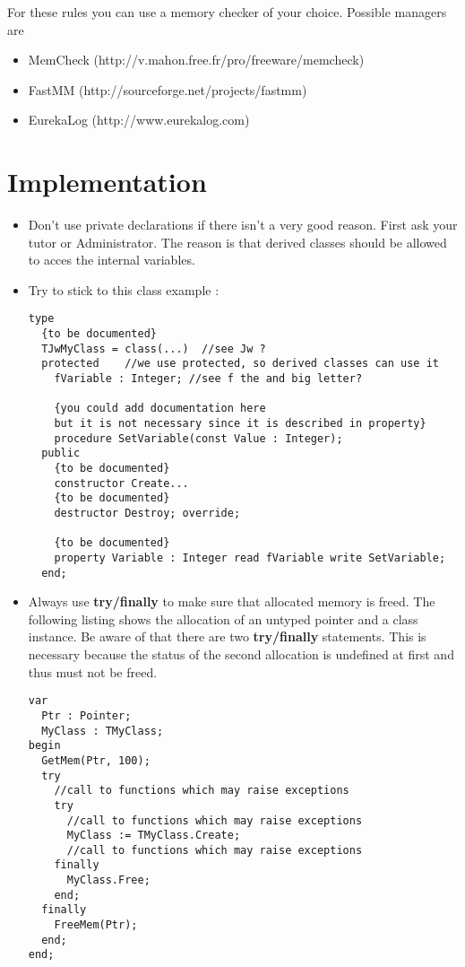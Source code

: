 \documentclass[a4paper,oneside,10pt]{article}
\begin{document}
For these rules you can use a memory checker of your choice. Possible managers are
\begin{itemize}
  \item MemCheck (http://v.mahon.free.fr/pro/freeware/memcheck)
  \item FastMM (http://sourceforge.net/projects/fastmm)
  \item EurekaLog (http://www.eurekalog.com)
\end{itemize}

\section{Implementation}

\begin{itemize}
	\item Don't use private declarations if there isn't a very good reason. First ask your tutor or Administrator. The reason is that derived classes should be allowed to acces the internal variables.
	\item Try to stick to this class example :
\begin{lstlisting}	
type
  {to be documented}
  TJwMyClass = class(...)  //see Jw ?
  protected    //we use protected, so derived classes can use it
    fVariable : Integer; //see f the and big letter?

    {you could add documentation here
    but it is not necessary since it is described in property}
    procedure SetVariable(const Value : Integer);
  public
    {to be documented}
    constructor Create...
    {to be documented}
    destructor Destroy; override;

    {to be documented}
    property Variable : Integer read fVariable write SetVariable;
  end;	
\end{lstlisting}
 
\item Always use \textbf{try/finally} to make sure that allocated memory is freed. The following listing shows the allocation of an untyped pointer and a class instance. Be aware of that there are two \textbf{try/finally} statements. This is necessary because the status of the second allocation is undefined at first and thus must not be freed.

\begin{lstlisting}
var 
  Ptr : Pointer;
  MyClass : TMyClass;
begin
  GetMem(Ptr, 100);
  try
    //call to functions which may raise exceptions
    try
      //call to functions which may raise exceptions
      MyClass := TMyClass.Create;
      //call to functions which may raise exceptions
    finally
      MyClass.Free;
    end;
  finally
    FreeMem(Ptr);
  end;
end;
\end{lstlisting}


\end{itemize}
\end{document}
